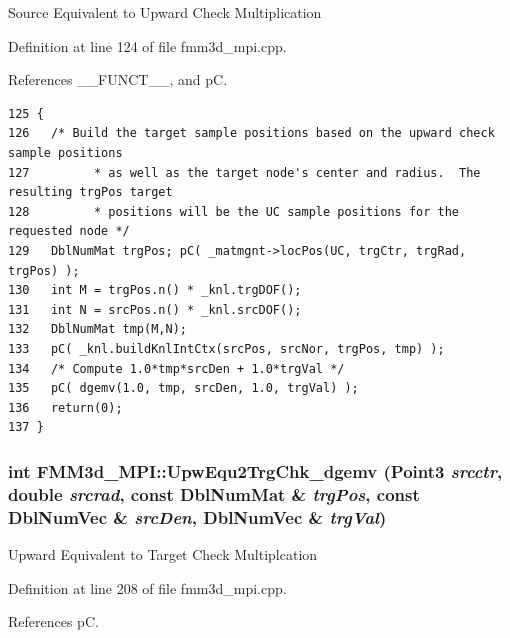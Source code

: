 Source Equivalent to Upward Check Multiplication 

Definition at line 124 of file fmm3d\_\-mpi.cpp.

References \_\-\_\-FUNCT\_\-\_\-, and p\-C.

\footnotesize\begin{verbatim}125 {
126   /* Build the target sample positions based on the upward check sample positions
127         * as well as the target node's center and radius.  The resulting trgPos target
128         * positions will be the UC sample positions for the requested node */
129   DblNumMat trgPos; pC( _matmgnt->locPos(UC, trgCtr, trgRad, trgPos) );
130   int M = trgPos.n() * _knl.trgDOF();
131   int N = srcPos.n() * _knl.srcDOF();
132   DblNumMat tmp(M,N);
133   pC( _knl.buildKnlIntCtx(srcPos, srcNor, trgPos, tmp) );
134   /* Compute 1.0*tmp*srcDen + 1.0*trgVal */
135   pC( dgemv(1.0, tmp, srcDen, 1.0, trgVal) );
136   return(0);
137 }
\end{verbatim}\normalsize 


\subsubsection{\setlength{\rightskip}{0pt plus 5cm}int FMM3d\_\-MPI::Upw\-Equ2Trg\-Chk\_\-dgemv (Point3 {\em srcctr}, double {\em srcrad}, const Dbl\-Num\-Mat \& {\em trg\-Pos}, const Dbl\-Num\-Vec \& {\em src\-Den}, Dbl\-Num\-Vec \& {\em trg\-Val})\hspace{0.3cm}{\tt  [protected]}}\label{classFMM3d__MPI_ed8ea5c9f09ac4e81f7e89fbf3780547_ed8ea5c9f09ac4e81f7e89fbf3780547}


Upward Equivalent to Target Check Multiplcation 

Definition at line 208 of file fmm3d\_\-mpi.cpp.

References p\-C.

